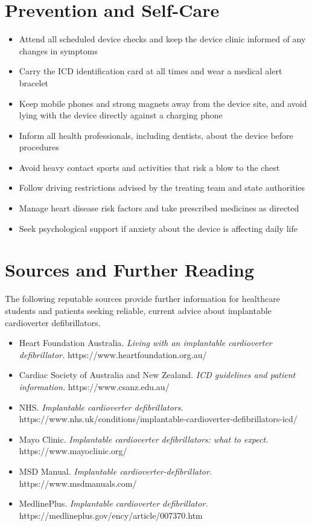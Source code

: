 \section*{Prevention and Self-Care}
\begin{itemize}
    \item Attend all scheduled device checks and keep the device clinic informed of any changes in symptoms
    \item Carry the ICD identification card at all times and wear a medical alert bracelet
    \item Keep mobile phones and strong magnets away from the device site, and avoid lying with the device directly against a charging phone
    \item Inform all health professionals, including dentists, about the device before procedures
    \item Avoid heavy contact sports and activities that risk a blow to the chest
    \item Follow driving restrictions advised by the treating team and state authorities
    \item Manage heart disease risk factors and take prescribed medicines as directed
    \item Seek psychological support if anxiety about the device is affecting daily life
\end{itemize}

\section*{Sources and Further Reading}
The following reputable sources provide further information for healthcare students and patients seeking reliable, current advice about implantable cardioverter defibrillators.
\begin{itemize}
    \item Heart Foundation Australia. \textit{Living with an implantable cardioverter defibrillator.} https://www.heartfoundation.org.au/
    \item Cardiac Society of Australia and New Zealand. \textit{ICD guidelines and patient information.} https://www.csanz.edu.au/
    \item NHS. \textit{Implantable cardioverter defibrillators.} https://www.nhs.uk/conditions/implantable-cardioverter-defibrillators-icd/
    \item Mayo Clinic. \textit{Implantable cardioverter defibrillators: what to expect.} https://www.mayoclinic.org/
    \item MSD Manual. \textit{Implantable cardioverter-defibrillator.} https://www.msdmanuals.com/
    \item MedlinePlus. \textit{Implantable cardioverter defibrillator.} https://medlineplus.gov/ency/article/007370.htm
\end{itemize}
